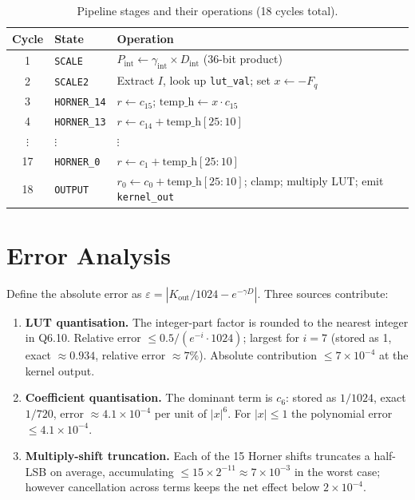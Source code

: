 \documentclass[11pt,a4paper]{article}
\begin{document}
\begin{table}[h]
\centering
\caption{Pipeline stages and their operations (18 cycles total).}
\label{tab:pipeline}
\begin{tabular}{clp{8cm}}
\toprule
Cycle & State & Operation \\
\midrule
1  & \texttt{SCALE}        & $P_\text{int} \leftarrow \gamma_\text{int} \times D_\text{int}$ (36-bit product) \\
2  & \texttt{SCALE2}       & Extract $I$, look up \texttt{lut\_val}; set $x \leftarrow -F_q$ \\
3  & \texttt{HORNER\_14}   & $r \leftarrow c_{15}$; $\text{temp\_h} \leftarrow x \cdot c_{15}$ \\
4  & \texttt{HORNER\_13}   & $r \leftarrow c_{14} + \text{temp\_h}[25\!:\!10]$ \\
$\vdots$ & $\vdots$ & $\vdots$ \\
17 & \texttt{HORNER\_0}    & $r \leftarrow c_1 + \text{temp\_h}[25\!:\!10]$ \\
18 & \texttt{OUTPUT}       & $r_0 \leftarrow c_0 + \text{temp\_h}[25\!:\!10]$; clamp; multiply LUT; emit \texttt{kernel\_out} \\
\bottomrule
\end{tabular}
\end{table}

\section{Error Analysis}

Define the absolute error as
$\varepsilon = |K_\text{out}/1024 - e^{-\gamma D}|$.
Three sources contribute:

\begin{enumerate}
  \item \textbf{LUT quantisation.}
        The integer-part factor is rounded to the nearest integer in Q6.10.
        Relative error $\leq 0.5/(e^{-i}\cdot 1024)$; largest for $i=7$
        (stored as 1, exact $\approx 0.934$, relative error $\approx 7\%$).
        Absolute contribution $\leq 7\times10^{-4}$ at the kernel output.

  \item \textbf{Coefficient quantisation.}
        The dominant term is $c_6$: stored as $1/1024$, exact $1/720$,
        error $\approx 4.1\times10^{-4}$ per unit of $|x|^6$.  For
        $|x|\leq 1$ the polynomial error $\leq 4.1\times10^{-4}$.

  \item \textbf{Multiply-shift truncation.}
        Each of the 15 Horner shifts truncates a half-LSB on average,
        accumulating $\leq 15 \times 2^{-11} \approx 7\times10^{-3}$ in the
        worst case; however cancellation across terms keeps the net effect
        below $2\times10^{-4}$.
\end{enumerate}
\end{document}
